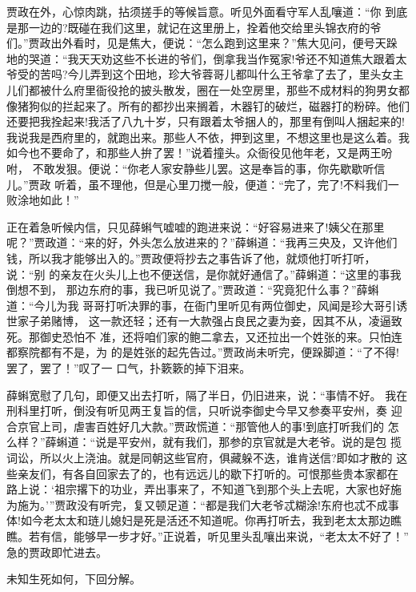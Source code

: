 贾政在外，心惊肉跳，拈须搓手的等候旨意。听见外面看守军人乱嚷道：“你
到底是那一边的?既碰在我们这里，就记在这里册上，拴着他交给里头锦衣府的爷
们。”贾政出外看时，见是焦大，便说：“怎么跑到这里来？”焦大见问，便号天跺
地的哭道：“我天天劝这些不长进的爷们，倒拿我当作冤家!爷还不知道焦大跟着太
爷受的苦吗?今儿弄到这个田地，珍大爷蓉哥儿都叫什么王爷拿了去了，里头女主
儿们都被什么府里衙役抢的披头散发，圈在一处空房里，那些不成材料的狗男女都
像猪狗似的拦起来了。所有的都抄出来搁着，木器钉的破烂，磁器打的粉碎。他们
还要把我拴起来!我活了八九十岁，只有跟着太爷捆人的，那里有倒叫人捆起来的!
我说我是西府里的，就跑出来。那些人不依，押到这里，不想这里也是这么着。我
如今也不要命了，和那些人拚了罢！”说着撞头。众衙役见他年老，又是两王吩咐，
不敢发狠。便说：“你老人家安静些儿罢。这是奉旨的事，你先歇歇听信儿。”贾政
听着，虽不理他，但是心里刀搅一般，便道：“完了，完了!不料我们一败涂地如此！”

正在着急听候内信，只见薛蝌气嘘嘘的跑进来说：“好容易进来了!姨父在那里
呢？”贾政道：“来的好，外头怎么放进来的？”薛蝌道：“我再三央及，又许他们
钱，所以我才能够出入的。”贾政便将抄去之事告诉了他，就烦他打听打听，说：“别
的亲友在火头儿上也不便送信，是你就好通信了。”薛蝌道：“这里的事我倒想不到，
那边东府的事，我已听见说了。”贾政道：“究竟犯什么事？”薛蝌道：“今儿为我
哥哥打听决罪的事，在衙门里听见有两位御史，风闻是珍大哥引诱世家子弟赌博，
这一款还轻；还有一大款强占良民之妻为妾，因其不从，凌逼致死。那御史恐怕不
准，还将咱们家的鲍二拿去，又还拉出一个姓张的来。只怕连都察院都有不是，为
的是姓张的起先告过。”贾政尚未听完，便跺脚道：“了不得!罢了，罢了！”叹了一
口气，扑簌簌的掉下泪来。

薛蝌宽慰了几句，即便又出去打听，隔了半日，仍旧进来，说：“事情不好。
我在刑科里打听，倒没有听见两王复旨的信，只听说李御史今早又参奏平安州，奏
迎合京官上司，虐害百姓好几大款。”贾政慌道：“那管他人的事!到底打听我们的
怎么样？”薛蝌道：“说是平安州，就有我们，那参的京官就是大老爷。说的是包
揽词讼，所以火上浇油。就是同朝这些官府，俱藏躲不迭，谁肯送信?即如才散的
这些亲友们，有各自回家去了的，也有远远儿的歇下打听的。可恨那些贵本家都在
路上说：‘祖宗撂下的功业，弄出事来了，不知道飞到那个头上去呢，大家也好施
为施为。’”贾政没有听完，复又顿足道：“都是我们大老爷忒糊涂!东府也忒不成事
体!如今老太太和琏儿媳妇是死是活还不知道呢。你再打听去，我到老太太那边瞧
瞧。若有信，能够早一步才好。”正说着，听见里头乱嚷出来说，“老太太不好了！”
急的贾政即忙进去。

未知生死如何，下回分解。
